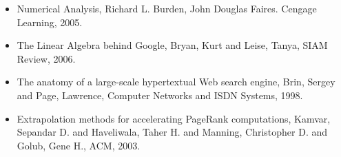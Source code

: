 \begin{itemize}
    \item Numerical Analysis, Richard L. Burden, John Douglas Faires. Cengage Learning, 2005.
    \item The Linear Algebra behind Google, Bryan, Kurt and Leise, Tanya, SIAM Review, 2006.
    \item The anatomy of a large-scale hypertextual Web search engine, Brin, Sergey and Page, Lawrence, Computer Networks and ISDN Systems, 1998.
    \item Extrapolation methods for accelerating PageRank computations, Kamvar, Sepandar D. and Haveliwala, Taher H. and Manning, Christopher D. and Golub, Gene H., ACM, 2003.
\end{itemize}

